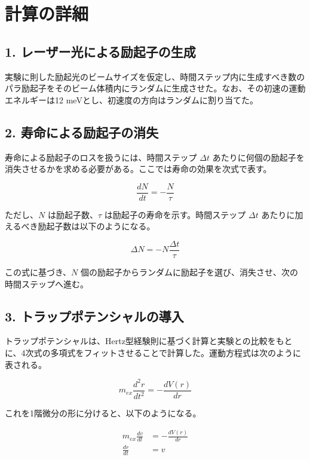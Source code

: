 
\section{計算の詳細}

\subsection{1. レーザー光による励起子の生成}
実験に則した励起光のビームサイズを仮定し、時間ステップ内に生成すべき数のパラ励起子をそのビーム体積内にランダムに生成させた。なお、その初速の運動エネルギーは12 meVとし、初速度の方向はランダムに割り当てた。

\subsection{2. 寿命による励起子の消失}
寿命による励起子のロスを扱うには、時間ステップ $\Delta t$ あたりに何個の励起子を消失させるかを求める必要がある。ここでは寿命の効果を次式で表す。

\begin{equation}
    \frac{dN}{dt} = -\frac{N}{\tau} \tag{7.62}
\end{equation}

ただし、$N$ は励起子数、$\tau$ は励起子の寿命を示す。時間ステップ $\Delta t$ あたりに加えるべき励起子数は以下のようになる。

\begin{equation}
    \Delta N = -N \frac{\Delta t}{\tau} \tag{7.63}
\end{equation}

この式に基づき、$N$ 個の励起子からランダムに励起子を選び、消失させ、次の時間ステップへ進む。

\subsection{3. トラップポテンシャルの導入}
トラップポテンシャルは、Hertz型経験則に基づく計算と実験との比較をもとに、4次式の多項式をフィットさせることで計算した。運動方程式は次のように表される。

\begin{equation}
    m_{ex} \frac{d^2 r}{dt^2} = -\frac{dV(r)}{dr} \tag{7.64}
\end{equation}

これを1階微分の形に分けると、以下のようになる。

\begin{align}
    m_{ex} \frac{dv}{dt} &= -\frac{dV(r)}{dr} \tag{7.65} \\
    \frac{dr}{dt} &= v \tag{7.66}
\end{align}

